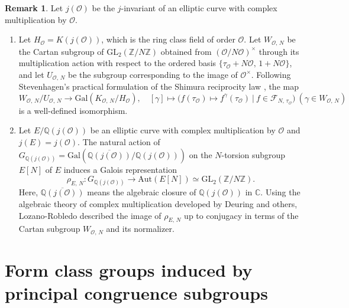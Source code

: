 \documentclass[reqno,11pt]{article}
\theoremstyle{plain} %
\theoremstyle{definition} %
\newtheorem{remark}[theorem]{\indent\sc Remark}
\begin{document}
\begin{remark}
Let $j(\mathcal{O})$ be the $j$-invariant of an elliptic curve
with complex multiplication by $\mathcal{O}$. 
\begin{enumerate}
\item[(i)] Let $H_{\mathcal{O}}=K(j(\mathcal{O}))$, 
which is the ring class field of order $\mathcal{O}$.
Let $W_{\mathcal{O},\,N}$ be the Cartan subgroup of
$\mathrm{GL}_2(\mathbb{Z}/N\mathbb{Z})$ obtained from
$(\mathcal{O}/N\mathcal{O})^\times$ through its multiplication action
with respect to the ordered basis
$\{\tau_{\mathcal{O}}+N\mathcal{O},\,1+N\mathcal{O}\}$, and let
$U_{\mathcal{O},\,N}$ be the subgroup corresponding to the image of
$\mathcal{O}^\times$. 
Following Stevenhagen's practical formulation of the Shimura
reciprocity law \cite{Stevenhagen}, the map
\begin{equation*}
W_{\mathcal{O},\,N}/U_{\mathcal{O},\,N}
\rightarrow\mathrm{Gal}(K_{\mathcal{O},\,N}/H_{\mathcal{O}}),
\quad[\gamma]\mapsto
\bigg(f(\tau_{\mathcal{O}})\mapsto f^\gamma(\tau_{\mathcal{O}})
~|~f\in\mathcal{F}_{N,\,\tau_\mathcal{O}}\bigg)~(\gamma\in W_{\mathcal{O},\,N})
\end{equation*}
is a well-defined isomorphism.
\item[(ii)] 
Let $E/\mathbb{Q}(j(\mathcal{O}))$ be an elliptic curve with
complex multiplication by $\mathcal{O}$ and
$j(E)=j(\mathcal{O})$.
The natural action of
$G_{\mathbb{Q}(j(\mathcal{O}))}=\mathrm{Gal}\left(
\overline{\mathbb{Q}(j(\mathcal{O}))}/\mathbb{Q}(j(\mathcal{O}))\right)$
on the $N$-torsion subgroup $E[N]$ of $E$ induces a Galois representation
\begin{equation*}
\rho_{E,\,N}:G_{\mathbb{Q}(j(\mathcal{O}))}\rightarrow
\mathrm{Aut}(E[N])\simeq\mathrm{GL}_2(\mathbb{Z}/N\mathbb{Z}).
\end{equation*}
Here, $\overline{\mathbb{Q}(j(\mathcal{O}))}$ means
the algebraic closure of $\mathbb{Q}(j(\mathcal{O}))$ in $\mathbb{C}$. 
Using the algebraic theory of complex multiplication developed by Deuring \cite{Deuring} and others, 
Lozano-Robledo \cite{Lozano-Robledo} described the image of $\rho_{E,\,N}$ 
up to conjugacy in terms of the Cartan subgroup $W_{\mathcal{O},\,N}$ and its normalizer. 
\end{enumerate}
\end{remark}

\section {Form class groups induced by principal congruence subgroups}
\end{document}
